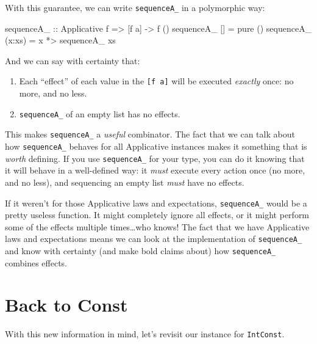 \documentclass[]{article}
\newenvironment{Shaded}{}{}
\newcommand{\DataTypeTok}[1]{\textcolor[rgb]{0.56,0.13,0.00}{#1}}
\newcommand{\FunctionTok}[1]{\textcolor[rgb]{0.02,0.16,0.49}{#1}}
\newcommand{\NormalTok}[1]{#1}
\newcommand{\OtherTok}[1]{\textcolor[rgb]{0.00,0.44,0.13}{#1}}
\begin{document}
With this guarantee, we can write \texttt{sequenceA\_} in a polymorphic way:

\begin{Shaded}
\begin{Highlighting}[]
\OtherTok{sequenceA_ ::} \DataTypeTok{Applicative}\NormalTok{ f }\OtherTok{=>}\NormalTok{ [f a] }\OtherTok{->}\NormalTok{ f ()}
\NormalTok{sequenceA_ []     }\FunctionTok{=}\NormalTok{ pure ()}
\NormalTok{sequenceA_ (x}\FunctionTok{:}\NormalTok{xs) }\FunctionTok{=}\NormalTok{ x }\FunctionTok{*>}\NormalTok{ sequenceA_ xs}
\end{Highlighting}
\end{Shaded}

And we can say with certainty that:

\begin{enumerate}
\def\labelenumi{\arabic{enumi}.}
\tightlist
\item
  Each ``effect'' of each value in the \texttt{{[}f\ a{]}} will be executed
  \emph{exactly} once: no more, and no less.
\item
  \texttt{sequenceA\_} of an empty list has no effects.
\end{enumerate}

This makes \texttt{sequenceA\_} a \emph{useful} combinator. The fact that we can
talk about how \texttt{sequenceA\_} behaves for all Applicative instances makes
it something that is \emph{worth} defining. If you use \texttt{sequenceA\_} for
your type, you can do it knowing that it will behave in a well-defined way: it
\emph{must} execute every action once (no more, and no less), and sequencing an
empty list \emph{must} have no effects.

If it weren't for those Applicative laws and expectations, \texttt{sequenceA\_}
would be a pretty useless function. It might completely ignore all effects, or
it might perform some of the effects multiple times\ldots{}who knows! The fact
that we have Applicative laws and expectations means we can look at the
implementation of \texttt{sequenceA\_} and know with certainty (and make bold
claims about) how \texttt{sequenceA\_} combines effects.

\hypertarget{back-to-const}{%
\section{Back to Const}\label{back-to-const}}

With this new information in mind, let's revisit our instance for
\texttt{IntConst}.
\end{document}

